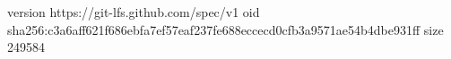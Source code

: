 version https://git-lfs.github.com/spec/v1
oid sha256:c3a6aff621f686ebfa7ef57eaf237fe688eccecd0cfb3a9571ae54b4dbe931ff
size 249584
